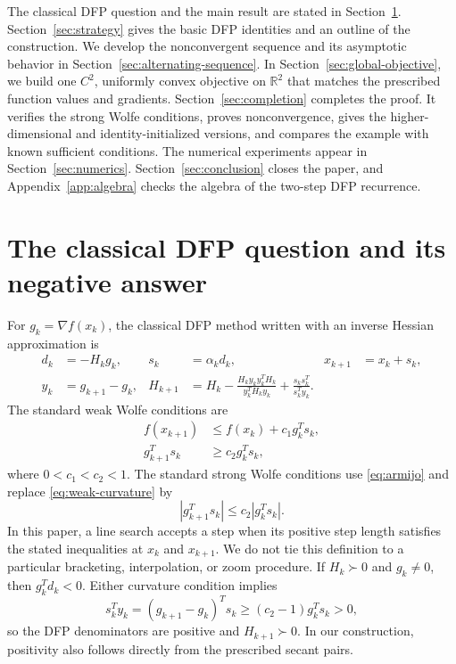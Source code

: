 \documentclass[11pt]{article}
\newcommand{\R}{\mathbb R}
\begin{document}
The classical DFP question and the main result are stated in
Section~\ref{sec:statement}.  Section~\ref{sec:strategy} gives the basic DFP
identities and an outline of the construction.  We develop the nonconvergent
sequence and its asymptotic behavior in
Section~\ref{sec:alternating-sequence}.  In
Section~\ref{sec:global-objective}, we build one $C^2$, uniformly convex
objective on $\R^2$ that matches the prescribed function values and gradients.
Section~\ref{sec:completion} completes the
proof.  It verifies the strong Wolfe conditions, proves nonconvergence, gives
the higher-dimensional and identity-initialized versions, and compares the
example with known sufficient conditions.  The numerical experiments appear
in Section~\ref{sec:numerics}.  Section~\ref{sec:conclusion} closes the paper,
and Appendix~\ref{app:algebra} checks the algebra of the two-step DFP
recurrence.

\section{The classical DFP question and its negative answer}
\label{sec:statement}

For $g_k=\nabla f(x_k)$, the classical DFP method written with an inverse
Hessian approximation is
\begin{align*}
d_k&=-H_kg_k,&s_k&=\alpha_kd_k,&x_{k+1}&=x_k+s_k,\\
y_k&=g_{k+1}-g_k,&
H_{k+1}&=H_k-
\frac{H_ky_ky_k^TH_k}{y_k^TH_ky_k}
+\frac{s_ks_k^T}{s_k^Ty_k}.
\end{align*}
The standard weak Wolfe conditions \cite{Wolfe1969} are
\begin{align}
f(x_{k+1})&\le f(x_k)+c_1g_k^Ts_k,\label{eq:armijo}\\
g_{k+1}^Ts_k&\ge c_2g_k^Ts_k,
\label{eq:weak-curvature}
\end{align}
where $0<c_1<c_2<1$.
The standard strong Wolfe conditions use \eqref{eq:armijo} and replace
\eqref{eq:weak-curvature} by
\begin{equation}\label{eq:strong-curvature}
|g_{k+1}^Ts_k|\le c_2|g_k^Ts_k|.
\end{equation}
In this paper, a line search accepts a step when its positive step length
satisfies the stated inequalities at $x_k$ and $x_{k+1}$.  We do not tie this
definition to a particular bracketing, interpolation, or zoom procedure.  If
$H_k\succ0$ and $g_k\ne0$, then
$g_k^Td_k<0$.  Either curvature condition
implies
\[
s_k^Ty_k=(g_{k+1}-g_k)^Ts_k
\ge (c_2-1)g_k^Ts_k>0,
\]
so the DFP denominators are positive and $H_{k+1}\succ0$.  In our
construction, positivity also follows directly from the prescribed secant
pairs.
\end{document}
